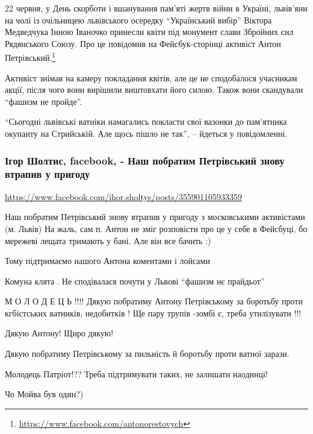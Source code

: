 22 червня, у День скорботи і вшанування пам'яті жертв війни в Україні,
львів'яни на чолі із очільницею львівського осередку \enquote{Український вибір}
Віктора Медведчука Інною Іваночко принесли квіти під монумент слави Збройних
сил Рядянського Союзу.  Про це повідомив на Фейсбук-сторінці активіст Антон
Петрівський.\footnote{\url{https://www.facebook.com/antonorestovych}}

Активіст знімав на камеру покладання квітів, але це не сподобалося учасникам
акції, після чого вони вирішили виштовхати його силою. Також вони скандували
\enquote{фашизм не пройде}.

\enquote{Сьогодні львівські ватніки намагались покласти свої вазонки до пам'ятника
окупанту на Стрийській. Але щось пішло не так}, – йдеться у повідомленні.

\subsubsection{Ігор Шолтис, facebook, - Наш побратим Петрівський знову втрапив у пригоду}

\url{https://www.facebook.com/ihor.sholtys/posts/355901105933359}

Наш побратим Петрівський знову втрапив у пригоду з московськими активістами (м.
Львів) На жаль, сам п. Антон не зміг розповісти про це у себе в Фейсбуці, бо
мережеві лещата тримають у бані.  Але він все бачить :)

Тому підтримаємо нашого Антона коментами і лойсами

\begin{itemize}
Комуна клята🤬. Не сподівалася почути у Львові \enquote{фашизм нє прайдьот} 🤬🤬🤬

М О Л О Д Е Ц Ь !!!!
Дякую побратиму Антону Петрівському за боротьбу проти кгбістських ватників,
недобитків ! Ще пару трупів -зомбі є, треба утилізувати !!!

Дякую Антону! Щиро дякую!

Дякую побратиму Петрівському за пильність й боротьбу проти ватної зарази.

Молодець Патріот!?? Треба підтримувати таких, не залишати наодинці!

Чо Мойва був один?)
\end{itemize}
